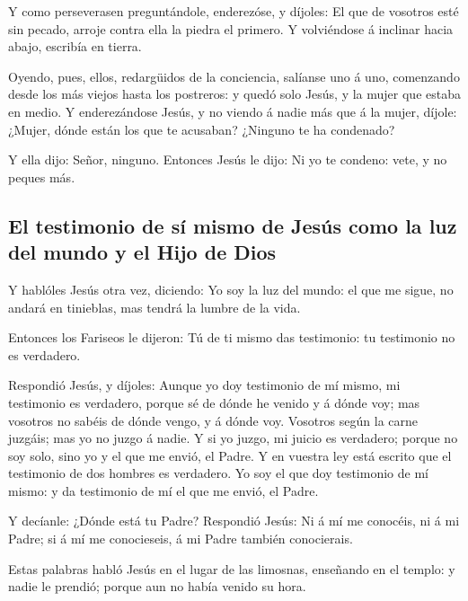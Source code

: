  Y como perseverasen preguntándole, enderezóse, y díjoles:
El que de vosotros esté sin pecado, arroje contra ella la piedra el
primero.  Y volviéndose á inclinar hacia abajo, escribía
en tierra.

 Oyendo, pues, ellos, redargüidos de la conciencia,
salíanse uno á uno, comenzando desde los más viejos hasta los postreros:
y quedó solo Jesús, y la mujer que estaba en medio.  Y
enderezándose Jesús, y no viendo á nadie más que á la mujer, díjole:
¿Mujer, dónde están los que te acusaban? ¿Ninguno te ha condenado?

 Y ella dijo: Señor, ninguno. Entonces Jesús le dijo: Ni
yo te condeno: vete, y no peques más.

\hypertarget{el-testimonio-de-suxed-mismo-de-jesuxfas-como-la-luz-del-mundo-y-el-hijo-de-dios}{%
\subsection{El testimonio de sí mismo de Jesús como la luz del mundo y
el Hijo de
Dios}\label{el-testimonio-de-suxed-mismo-de-jesuxfas-como-la-luz-del-mundo-y-el-hijo-de-dios}}

 Y hablóles Jesús otra vez, diciendo: Yo soy la luz del
mundo: el que me sigue, no andará en tinieblas, mas tendrá la lumbre de
la vida.

 Entonces los Fariseos le dijeron: Tú de ti mismo das
testimonio: tu testimonio no es verdadero.

 Respondió Jesús, y díjoles: Aunque yo doy testimonio de
mí mismo, mi testimonio es verdadero, porque sé de dónde he venido y á
dónde voy; mas vosotros no sabéis de dónde vengo, y á dónde voy.
 Vosotros según la carne juzgáis; mas yo no juzgo á
nadie.  Y si yo juzgo, mi juicio es verdadero; porque no
soy solo, sino yo y el que me envió, el Padre.  Y en
vuestra ley está escrito que el testimonio de dos hombres es verdadero.
 Yo soy el que doy testimonio de mí mismo: y da
testimonio de mí el que me envió, el Padre.

 Y decíanle: ¿Dónde está tu Padre? Respondió Jesús: Ni á
mí me conocéis, ni á mi Padre; si á mí me conocieseis, á mi Padre
también conocierais.

 Estas palabras habló Jesús en el lugar de las limosnas,
enseñando en el templo: y nadie le prendió; porque aun no había venido
su hora.

